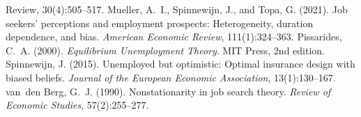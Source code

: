 \documentclass[11pt]{article}
\begin{document}
\begin{thebibliography}{}
{Review}, 30(4):505--517.
Mueller, A.~I., Spinnewijn, J., and Topa, G. (2021). Job seekers' perceptions and employment prospects:
Heterogeneity, duration dependence, and bias. \textit{American Economic Review}, 111(1):324--363.
Pissarides, C.~A. (2000). \textit{Equilibrium Unemployment Theory}. MIT Press, 2nd edition.
Spinnewijn, J. (2015). Unemployed but optimistic: Optimal insurance design with biased beliefs. \textit{Journal of
the European Economic Association}, 13(1):130--167.
van~den Berg, G.~J. (1990). Nonstationarity in job search theory. \textit{Review of Economic Studies}, 57(2):255--277.
\end{thebibliography}
\end{document}

